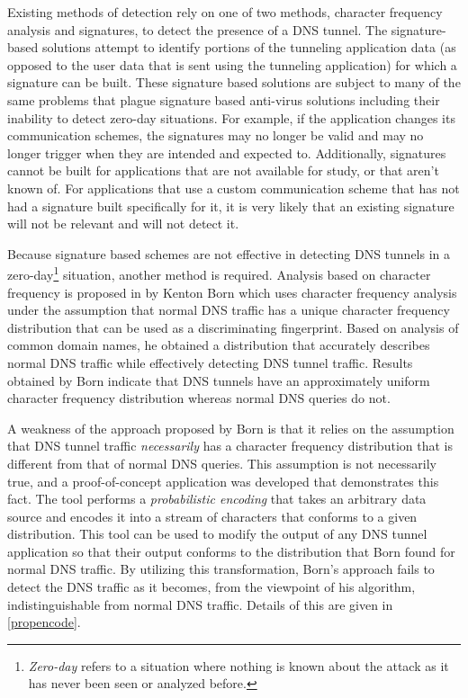 \documentclass[12pt]{article}
\theoremstyle{remark}
\theoremstyle{definition}
\theoremstyle{definition}
\theoremstyle{definition}
\begin{document}
Existing methods of detection rely on one of two methods, character frequency analysis
and signatures, to detect the presence of a DNS tunnel. The signature-based solutions attempt to identify portions of the tunneling
application data (as opposed to the user data that is sent using the tunneling
application) for which a signature can be built. These signature based
solutions are subject to many of the same problems that plague signature based
anti-virus solutions including their inability to detect zero-day situations.
 For example, if the application changes its communication
schemes, the signatures may no longer be valid and may no longer trigger when
they are intended and expected to. Additionally, signatures cannot be built for applications
that are not available for study, or that aren't known of. For applications
that use a custom communication scheme that has not had a signature built
specifically for it, it is very likely that an existing signature will not be
relevant and will not detect it.

Because signature based schemes are not effective in detecting DNS tunnels in a
zero-day\footnote{\emph{Zero-day} refers to a situation where nothing is
known about the attack as it has never been seen or analyzed before.} situation, another
method is required. Analysis based on character frequency is proposed
in\cite{Born2010.cfa} by Kenton Born which uses character
frequency analysis under the assumption that normal DNS traffic has a unique
character frequency distribution that can be used as a discriminating fingerprint. Based on analysis of common domain names, he obtained a
distribution that accurately describes normal DNS traffic while
effectively detecting DNS tunnel traffic. Results obtained by Born indicate
that DNS tunnels have an approximately uniform character frequency distribution whereas normal DNS queries do not.

A weakness of the approach proposed by Born is that it relies on the assumption
that DNS tunnel traffic \emph{necessarily} has a character frequency
distribution that is different from that of normal DNS queries. This assumption is not necessarily true, and a proof-of-concept application
was developed that demonstrates this fact. The tool performs a
\emph{probabilistic encoding} that takes an arbitrary data source and encodes
it into a stream of characters that conforms to a given distribution. This tool
can be used to modify the output of any DNS tunnel application so that their
output conforms to the distribution that Born found for normal DNS traffic. By
utilizing this transformation, Born's approach fails to detect the DNS traffic
as it becomes, from the viewpoint of his algorithm, indistinguishable from
normal DNS traffic. Details of this are given in \ref{propencode}.
\end{document}
